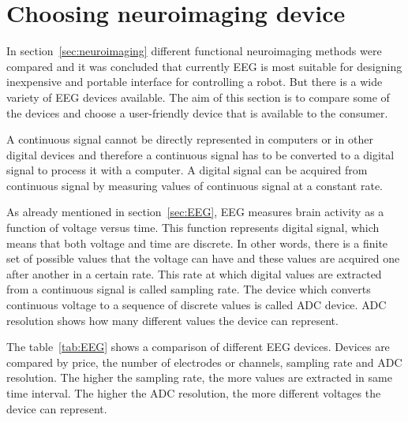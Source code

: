 \section{Choosing neuroimaging device}
\label{sec:EEG_comparison}

In section~\ref{sec:neuroimaging} different functional neuroimaging methods were compared and it was concluded that currently \gls{EEG} is most suitable for designing inexpensive and portable interface for controlling a robot. But there is a wide variety of \gls{EEG} devices available. The aim of this section is to compare some of the devices and choose a user-friendly device that is available to the consumer.

A continuous signal cannot be directly represented in computers or in other digital devices and therefore a continuous signal has to be converted to a \gls{digital signal} to process it with a computer. A \gls{digital signal} can be acquired from continuous signal by measuring values of continuous signal at a constant rate.

As already mentioned in section~\ref{sec:EEG}, \gls{EEG} measures brain activity as a function of voltage versus time. This function represents \gls{digital signal}, which means that both voltage and time are discrete. In other words, there is a finite set of possible values that the voltage can have and these values are acquired one after another in a certain rate. This rate at which digital values are extracted from a continuous signal is called \gls{sampling rate}. The device which converts continuous voltage to a sequence of discrete values is called \gls{ADC} device. \gls{ADC} resolution shows how many different values the device can represent.

The table~\ref{tab:EEG} shows a comparison of different \gls{EEG} devices. Devices are compared by price, the number of electrodes or channels, \gls{sampling rate} and \gls{ADC} resolution. The higher the sampling rate, the more values are extracted in same time interval. The higher the \gls{ADC} resolution, the more different voltages the device can represent.

\newcommand{\patiCHamp}{\tablefootnote{http://www.brainvision.com/files/actiCHamp-PyCorder-Flyer\_US.pdf}}
\newcommand{\pmitsar}{\tablefootnote{http://www.novatecheeg.com/products--software.html}}
\newcommand{\pemotiv}{\tablefootnote{https://emotiv.com/epoc.php}}
\newcommand{\pmindwave}{\tablefootnote{http://store.neurosky.com/products/mindwave-1}}
\newcommand{\mitsarspec}{\tablefootnote{http://www.mitsar-medical.com/eeg-machine/eeg-amplifier-compare/}}
\newcommand{\popenbci}{\tablefootnote{http://openbci.myshopify.com/products/openbci-8-bit-board-kit}}

